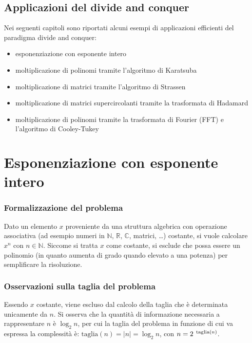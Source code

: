 \subsection{Applicazioni del divide and conquer}
Nei seguenti capitoli sono riportati alcuni esempi di applicazioni efficienti del paradigma divide and conquer:
\begin{itemize}
	\item esponenziazione con esponente intero
	\item moltiplicazione di polinomi tramite l'algoritmo di Karatsuba
	\item moltiplicazione di matrici tramite l'algoritmo di Strassen
	\item moltiplicazione di matrici supercircolanti tramite la trasformata di Hadamard
	\item moltiplicazione di polinomi tramite la trasformata di Fourier (FFT) e l'algoritmo di Cooley-Tukey
\end{itemize}

\newpage

\section{Esponenziazione con esponente intero}
\subsubsection*{Formalizzazione del problema}
Dato un elemento \(x\) proveniente da una struttura algebrica con operazione associativa (ad esempio numeri in \(\mathbb{N}\),
\(\mathbb{R}\), \(\mathbb{C}\), matrici, \dots) costante, si vuole calcolare \(x^n\) con \(n \in \mathbb{N}\). Siccome si
tratta \(x\) come costante, si esclude che possa essere un polinomio (in quanto aumenta di grado quando elevato a una potenza)
per semplificare la risoluzione.

\subsubsection*{Osservazioni sulla taglia del problema}
Essendo \(x\) costante, viene escluso dal calcolo della taglia che è determinata unicamente da \(n\). Si osserva che la
quantità di informazione necessaria a rappresentare \(n\) è \(\log_2 n\), per cui la taglia del problema in funzione di
cui va espressa la complessità è: \(\text{taglia}(n) = |n| = \log_2 n\), con \(n = 2 ^{\text{\, taglia}(n)}\).

